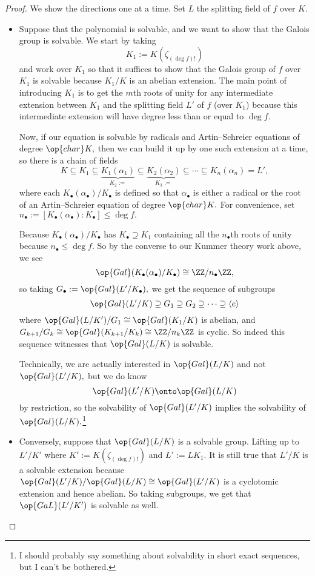 \begin{proof}
	We show the directions one at a time. Set $L$ the splitting field of $f$ over $K.$
	\begin{itemize}
		\item Suppose that the polynomial is solvable, and we want to show that the Galois group is solvable. We start by taking
		\[K_1:=K(\zeta_{(\deg f)!})\]
		and work over $K_1$ so that it suffices to show that the Galois group of $f$ over $K_1$ is solvable because $K_1/K$ is an abelian extension. The main point of introducing $K_1$ is to get the $m$th roots of unity for any intermediate extension between $K_1$ and the splitting field $L'$ of $f$ (over $K_1$) because this intermediate extension will have degree less than or equal to $\deg f.$
		
		Now, if our equation is solvable by radicals and Artin--Schreier equations of degree $\op{char}K,$ then we can build it up by one such extension at a time, so there is a chain of fields
		\[K\subseteq K_1\subseteq \underbrace{K_1(\alpha_1)}_{K_2:=}\subseteq \underbrace{K_2(\alpha_2)}_{K_3:=}\subseteq\cdots\subseteq K_n(\alpha_n)= L',\]
		where each $K_\bullet(\alpha_\bullet)/K_\bullet$ is defined so that $\alpha_\bullet$ is either a radical or the root of an Artin--Schreier equation of degree $\op{char}K.$ For convenience, set $n_\bullet:=[K_\bullet(\alpha_\bullet):K_\bullet]\le\deg f.$
		
		Because $K_\bullet(\alpha_\bullet)/K_\bullet$ has $K_\bullet\supseteq K_1$ containing all the $n_\bullet$th roots of unity because $n_\bullet\le\deg f.$ So by the converse to our Kummer theory work above, we see
		\[\op{Gal}(K_\bullet(\alpha_\bullet)/K_\bullet)\cong\ZZ/n_\bullet\ZZ,\]
		so taking $G_\bullet:=\op{Gal}(L'/K_\bullet),$ we get the sequence of subgroups
		\[\op{Gal}(L'/K)\supseteq G_1\supseteq G_2\supseteq\cdots\supseteq\langle e\rangle\]
		where $\op{Gal}(L/K')/G_1\cong\op{Gal}(K_1/K)$ is abelian, and $G_{k+1}/G_k\cong\op{Gal}(K_{k+1}/K_k)\cong\ZZ/n_k\ZZ$ is cyclic. So indeed this sequence witnesses that $\op{Gal}(L/K)$ is solvable.

		Technically, we are actually interested in $\op{Gal}(L/K)$ and not $\op{Gal}(L'/K),$ but we do know
		\[\op{Gal}(L'/K)\onto\op{Gal}(L/K)\]
		by restriction, so the solvability of $\op{Gal}(L'/K)$ implies the solvability of $\op{Gal}(L/K).$\footnote{I should probably say something about solvability in short exact sequences, but I can't be bothered.}
		\item Conversely, suppose that $\op{Gal}(L/K)$ is a solvable group. Lifting up to $L'/K'$ where $K':=K(\zeta_{(\deg f)!})$ and $L':=LK_1.$ It is still true that $L'/K$ is a solvable extension because $\op{Gal}(L'/K)/\op{Gal}(L/K)\cong\op{Gal}(L'/K)$ is a cyclotomic extension and hence abelian. So taking subgroups, we get that $\op{GaL}(L'/K')$ is solvable as well.


\end{itemize}
\end{proof}
